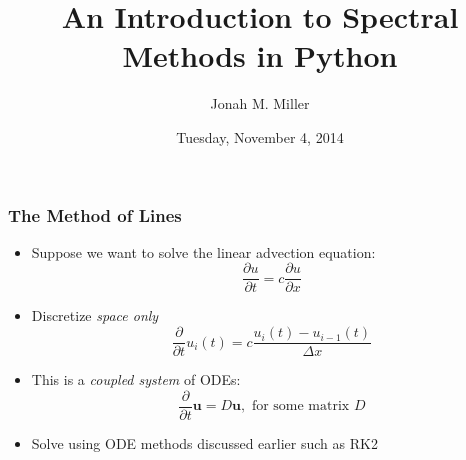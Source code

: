 \documentclass[]{beamer}
\title[spectral]{An Introduction to Spectral Methods in Python}
\author[J. Miller]{Jonah M. Miller}
\institute[PI]{Perimeter Institute}
\date[November 2014]{Tuesday, November 4, 2014}
\newcommand{\myvec}[1]{\mathbf{#1}} %
\newcommand{\pd}[2]{\frac{\partial #1}{\partial #2}}
\newcommand{\pdd}[1]{\frac{\partial}{\partial #1}}
\begin{document}
\begin{frame}[plain]
\titlepage
\end{frame}


\begin{frame}
  \frametitle{The Method of Lines}
  \pause
  \begin{itemize}
    \item Suppose we want to solve the linear advection equation:
      $$\pd{u}{t} = c \pd{u}{x}$$
    \item Discretize \textit{space only}
      $$\pdd{t}{u_i(t)} = c \frac{u_i(t) - u_{i-1}(t)}{\Delta x}$$
    \item This is a \textit{coupled system} of ODEs:
      $$\pdd{t}\myvec{u} = D \myvec{u},\text{ for some matrix }D$$
    \item Solve using ODE methods discussed earlier such as RK2
  \end{itemize}
\end{frame}
\end{document}

